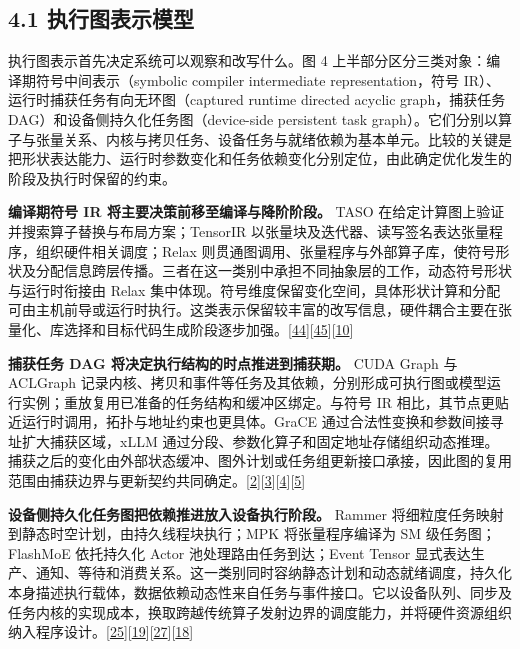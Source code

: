 \documentclass[UTF8,10.5pt,fontset=windows]{ctexart}
\begin{document}
\hypertarget{section-4-1}{%
\subsection{4.1 执行图表示模型}\label{section-4-1}}

执行图表示首先决定系统可以观察和改写什么。图 4
上半部分区分三类对象：编译期符号中间表示（symbolic compiler intermediate
representation，符号 IR）、运行时捕获任务有向无环图（captured runtime
directed acyclic graph，捕获任务 DAG）和设备侧持久化任务图（device-side
persistent task
graph）。它们分别以算子与张量关系、内核与拷贝任务、设备任务与就绪依赖为基本单元。比较的关键是把形状表达能力、运行时参数变化和任务依赖变化分别定位，由此确定优化发生的阶段及执行时保留的约束。

\textbf{编译期符号 IR 将主要决策前移至编译与降阶阶段。} TASO
在给定计算图上验证并搜索算子替换与布局方案；TensorIR
以张量块及迭代器、读写签名表达张量程序，组织硬件相关调度；Relax
则贯通图调用、张量程序与外部算子库，使符号形状及分配信息跨层传播。三者在这一类别中承担不同抽象层的工作，动态符号形状与运行时衔接由
Relax
集中体现。符号维度保留变化空间，具体形状计算和分配可由主机前导或运行时执行。这类表示保留较丰富的改写信息，硬件耦合主要在张量化、库选择和目标代码生成阶段逐步加强。{[}\protect\hyperlink{ref-jia2019taso}{44}{]}{[}\protect\hyperlink{ref-feng2023tensorir}{45}{]}{[}\protect\hyperlink{ref-lai2025relax}{10}{]}

\textbf{捕获任务 DAG 将决定执行结构的时点推进到捕获期。} CUDA Graph 与
ACLGraph
记录内核、拷贝和事件等任务及其依赖，分别形成可执行图或模型运行实例；重放复用已准备的任务结构和缓冲区绑定。与符号
IR 相比，其节点更贴近运行时调用，拓扑与地址约束也更具体。GraCE
通过合法性变换和参数间接寻址扩大捕获区域，xLLM
通过分段、参数化算子和固定地址存储组织动态推理。捕获之后的变化由外部状态缓冲、图外计划或任务组更新接口承接，因此图的复用范围由捕获边界与更新契约共同确定。{[}\protect\hyperlink{ref-nvidia2026cuda1303}{2}{]}{[}\protect\hyperlink{ref-cann900overview}{3}{]}{[}\protect\hyperlink{ref-ghosh2026grace}{4}{]}{[}\protect\hyperlink{ref-liu2025xllm}{5}{]}

\textbf{设备侧持久化任务图把依赖推进放入设备执行阶段。} Rammer
将细粒度任务映射到静态时空计划，由持久线程块执行；MPK 将张量程序编译为
SM 级任务图；FlashMoE 依托持久化 Actor 池处理路由任务到达；Event Tensor
显式表达生产、通知、等待和消费关系。这一类别同时容纳静态计划和动态就绪调度，持久化本身描述执行载体，数据依赖动态性来自任务与事件接口。它以设备队列、同步及任务内核的实现成本，换取跨越传统算子发射边界的调度能力，并将硬件资源组织纳入程序设计。{[}\protect\hyperlink{ref-ma2020rammer}{25}{]}{[}\protect\hyperlink{ref-cheng2026mpk}{19}{]}{[}\protect\hyperlink{ref-aimuyo2025flashmoe}{27}{]}{[}\protect\hyperlink{ref-jin2026eventtensor}{18}{]}
\end{document}
